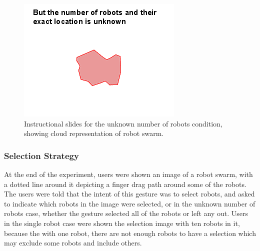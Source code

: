\begin{figure}
		\includegraphics[width=\linewidth]{../ui_experiment/slide_images/Swarm_Robot_Control_-_Unknown_Number_of_Robots_0003.png}
	\caption{Instructional slides for the unknown number of robots condition, showing cloud representation of robot swarm.}
	\label{instructional_slides}
\end{figure}

\subsubsection{Selection Strategy}

At the end of the experiment, users were shown an image of a robot swarm, with a dotted line around it depicting a finger drag path around some of the robots. 
The users were told that the intent of this gesture was to select robots, and asked to indicate which robots in the image were selected, or in the unknown number of robots case, whether the gesture selected all of the robots or left any out. 
Users in the single robot case were shown the selection image with ten robots in it, because the with one robot, there are not enough robots to have a selection which may exclude some robots and include others. 

